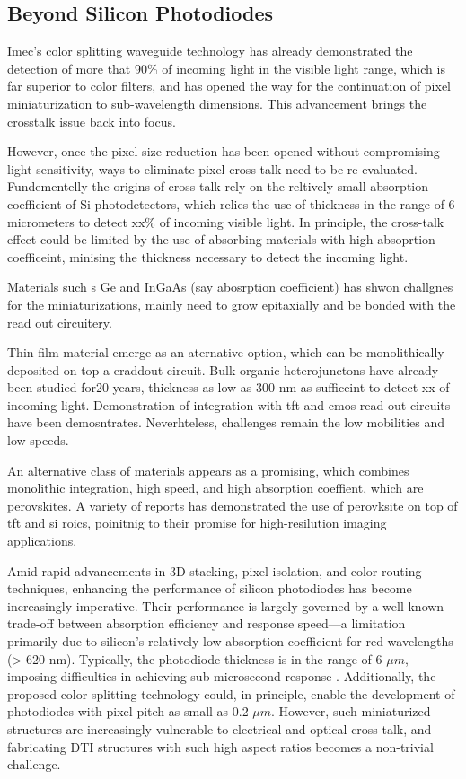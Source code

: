 \subsection{Beyond Silicon Photodiodes}

Imec's color splitting waveguide technology has already demonstrated the detection of more that 90\% of incoming light in the visible light range, which is far superior to color filters, and has opened the way for the continuation of pixel miniaturization to sub-wavelength dimensions. This advancement brings the crosstalk issue back into focus. 




However, once the pixel size reduction has been opened without compromising light sensitivity, ways to eliminate pixel cross-talk need to be re-evaluated. Fundementelly the origins of cross-talk rely on the reltively small absorption coefficient of Si photodetectors, which relies the use of thickness in the range of 6 micrometers to detect xx\% of incoming visible light. In principle, the cross-talk effect could be limited by the use of absorbing materials with high absoprtion coefficeint, minising the thickness necessary to detect the incoming light. 

Materials such s Ge and InGaAs (say abosrption coefficient) has shwon challgnes for the miniaturizations, mainly need to grow epitaxially and be bonded with the read out circuitery. 

Thin film material emerge as an aternative option, which can be monolithically deposited on top a eraddout circuit. Bulk organic heterojunctons have already been studied for20 years, thickness as low as 300 nm as sufficeint to detect xx of incoming light. Demonstration of integration with tft and cmos read out circuits have been demosntrates. Neverhteless, challenges remain the low mobilities and low speeds. 

An alternative class of materials appears as a promising, which combines monolithic integration, high speed, and high absorption coeffient, which are perovskites. A variety of reports has demonstrated the use of perovksite on top of tft and si roics, poinitnig to their promise for high-resilution imaging applications. 

Amid rapid advancements in 3D stacking, pixel isolation, and color routing techniques, enhancing the performance of silicon photodiodes has become increasingly imperative. Their performance is largely governed by a well-known trade-off between absorption efficiency and response speed—a limitation primarily due to silicon's relatively low absorption coefficient for red wavelengths (> 620 nm). Typically, the photodiode thickness is in the range of 6 $\mu m$, imposing difficulties in achieving sub-microsecond response \cite{Han2016ASensors}. Additionally, the proposed color splitting technology could, in principle, enable the development of photodiodes with pixel pitch as small as 0.2 $\mu m$. However, such miniaturized structures are increasingly vulnerable to electrical and optical cross-talk, and fabricating DTI structures with such high aspect ratios becomes a non-trivial challenge. 


